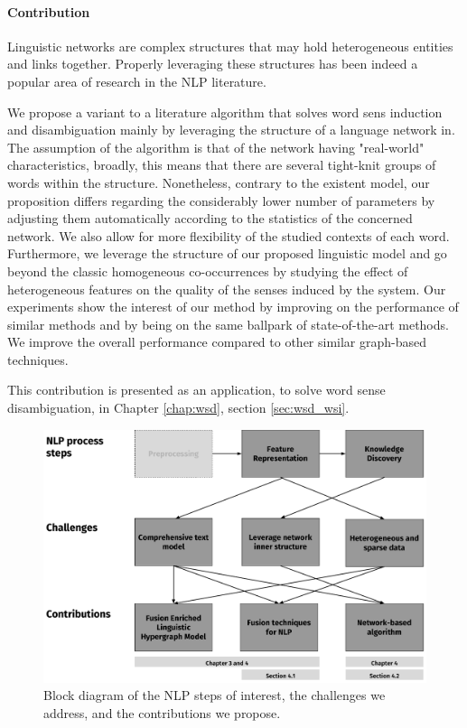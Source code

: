 \paragraph{Contribution}
Linguistic networks are complex structures that may hold  heterogeneous entities and links together. Properly leveraging these structures has been indeed a popular area of research in the NLP literature. 

We propose a variant to a literature algorithm that solves word sens induction and disambiguation mainly by leveraging  the structure of a language network in. The assumption of the algorithm is that of the network having "real-world" characteristics, broadly, this means that there are several tight-knit groups of words within the structure. Nonetheless, contrary to the existent model, our proposition differs regarding the considerably lower number of parameters by adjusting them automatically according to the statistics of the concerned network. We also allow for more flexibility of the studied contexts of each word. Furthermore, we leverage the structure of our proposed linguistic model and go beyond the classic homogeneous co-occurrences by studying the effect of heterogeneous features on the quality of the senses induced by the system. Our experiments show the interest of our method by improving on the performance of similar methods and by being on the same ballpark of state-of-the-art methods. 
 We  improve the overall performance compared to other similar graph-based techniques. 
 
 This contribution is presented as an application, to solve word sense disambiguation, in Chapter \ref{chap:wsd}, section \ref{sec:wsd_wsi}.



\begin{figure}
\centering
\includegraphics[width=1\linewidth]{./images/Chapitre1/challenges_contribs.pdf}
\caption{Block diagram of the NLP steps of interest, the challenges we address, and the contributions we propose.}
\label{fig:challenges_contribs}
\end{figure}
